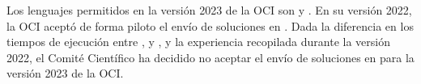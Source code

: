 Los lenguajes permitidos en la versión 2023 de la OCI son \cpp y \java.
%
En su versión 2022, la OCI aceptó de forma piloto el envío de soluciones en \python.
%
Dada la diferencia en los tiempos de ejecución entre \python, \cpp y \java, y la experiencia
recopilada durante la versión 2022, el Comité Científico ha decidido no aceptar
el envío de soluciones en \python para la versión 2023 de la OCI.
